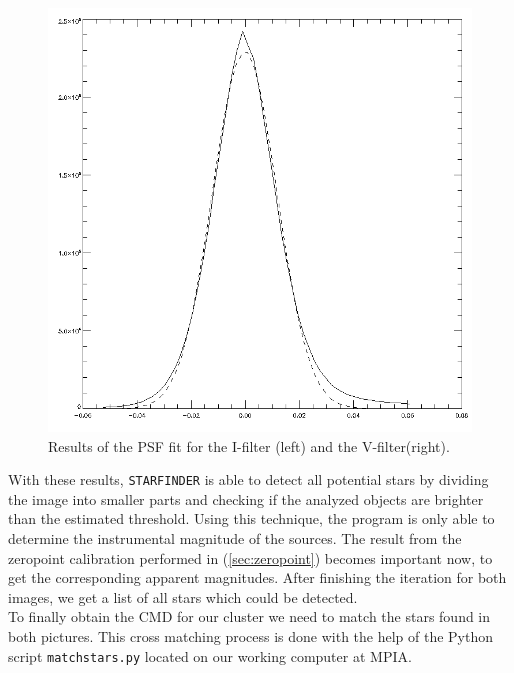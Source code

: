 \begin{figure}[H]
\begin{minipage}{0.2\textwidth}
\vspace{3pt}
\hspace{15pt}
		\includegraphics[scale=0.14]{figures/Exposures/psf_noise_V.png}
\end{minipage}
\caption[Results of the PSF fit]{Results of the PSF fit for the I-filter (left) and the V-filter(right).} 
\end{figure} 

With these results, \texttt{STARFINDER} is able to detect all potential stars by dividing the image into smaller parts and checking if the analyzed objects are brighter than the estimated threshold. 
Using this technique, the program is only able to determine the instrumental magnitude of the sources. The result from the zeropoint calibration performed in (\ref{sec:zeropoint}) becomes important now, to get the corresponding apparent magnitudes.
After finishing the iteration for both images, we get a list of all stars which could be detected. \\
To finally obtain the CMD for our cluster we need to match the stars found in both pictures. This cross matching process is done with the help of the Python script \texttt{matchstars.py} located on our working computer at MPIA. \\ 

